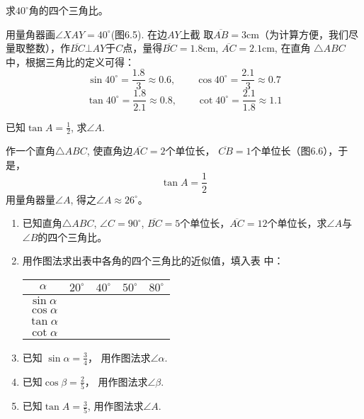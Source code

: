 \begin{example}
      求$40^{\circ}$角的四个三角比。
\end{example}

\begin{solution}
 用量角器画$\angle XAY=40^{\circ}$(图6.5). 在边$AY$上截
取$\overline{AB}=3$cm（为计算方便，我们尽量取整数），作$\overline{BC}\bot AY$于$C$点，量得$\overline{BC}=1.8$cm, $\overline{AC}=2.1$cm, 在直角
$\triangle ABC$中，根据三角比的定义可得：
\[\sin40^{\circ}=\frac{1.8}{3}\approx 0.6,\qquad \cos40^{\circ}=\frac{2.1}{3}\approx 0.7 \]
\[\tan40^{\circ}=\frac{1.8}{2.1}\approx 0.8,\qquad \cot40^{\circ}=\frac{2.1}{1.8}\approx 1.1\]
\end{solution}

\begin{example}
    已知$\tan A=\frac{1}{2}$, 求$\angle A$.
\end{example}

\begin{figure}[htp]
    \centering
{}
    \caption{}
\end{figure}

\begin{solution}
    作一个直角$\triangle ABC$, 使直角边$\overline{AC}=2$个单位长，
$\overline{CB}=1$个单位长（图6.6），于是，
\[\tan A=\frac{1}{2}\]
用量角器量$\angle A$, 得之$\angle A\approx 26^{\circ}$。
\end{solution}

\begin{ex}
\begin{enumerate}
    \item 已知直角$\triangle ABC$, $\angle C=90^{\circ}$, $\overline{BC}=5$个单位长，$\overline{AC}=
    12$个单位长，求$\angle A$与$\angle B$的四个三角比。
    \item 用作图法求出表中各角的四个三角比的近似值，填入表
    中：
\begin{center}
    \begin{tabular}{c|cccc}
\hline
        $\alpha$ & $20^{\circ}$ & $40^{\circ}$ & $50^{\circ}$ & $80^{\circ}$\\
\hline
$\sin\alpha$\\
$\cos\alpha$\\
$\tan\alpha$\\
$\cot\alpha$\\
\hline
    \end{tabular}
\end{center}
\item 已知 $\sin\alpha=\frac{3}{4}$，
用作图法求$\angle\alpha$.
\item 已知$\cos\beta=\frac{2}{5}$，
用作图法求$\angle \beta$.
\item 已知$\tan A=\frac{3}{5}$, 
用作图法求$\angle A$.
\end{enumerate}
\end{ex}

